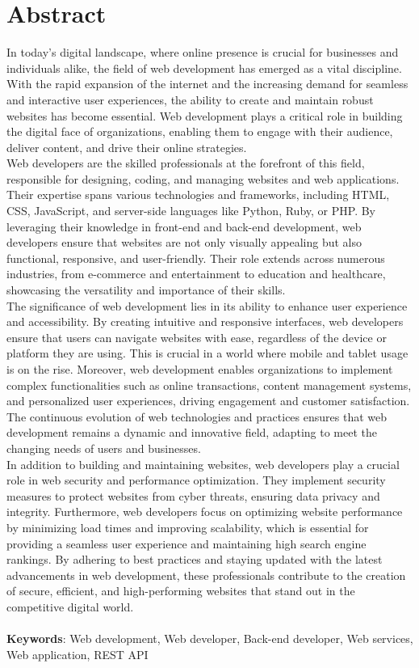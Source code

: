 \section{Abstract}

In today's digital landscape, where online presence is crucial for businesses and individuals alike, the field of web development has emerged as a vital discipline. With the rapid expansion of the internet and the increasing demand for seamless and interactive user experiences, the ability to create and maintain robust websites has become essential. Web development plays a critical role in building the digital face of organizations, enabling them to engage with their audience, deliver content, and drive their online strategies. \\
\newline
Web developers are the skilled professionals at the forefront of this field, responsible for designing, coding, and managing websites and web applications. Their expertise spans various technologies and frameworks, including HTML, CSS, JavaScript, and server-side languages like Python, Ruby, or PHP. By leveraging their knowledge in front-end and back-end development, web developers ensure that websites are not only visually appealing but also functional, responsive, and user-friendly. Their role extends across numerous industries, from e-commerce and entertainment to education and healthcare, showcasing the versatility and importance of their skills. \\
\newline
The significance of web development lies in its ability to enhance user experience and accessibility. By creating intuitive and responsive interfaces, web developers ensure that users can navigate websites with ease, regardless of the device or platform they are using. This is crucial in a world where mobile and tablet usage is on the rise. Moreover, web development enables organizations to implement complex functionalities such as online transactions, content management systems, and personalized user experiences, driving engagement and customer satisfaction. The continuous evolution of web technologies and practices ensures that web development remains a dynamic and innovative field, adapting to meet the changing needs of users and businesses. \\
\newline
In addition to building and maintaining websites, web developers play a crucial role in web security and performance optimization. They implement security measures to protect websites from cyber threats, ensuring data privacy and integrity. Furthermore, web developers focus on optimizing website performance by minimizing load times and improving scalability, which is essential for providing a seamless user experience and maintaining high search engine rankings. By adhering to best practices and staying updated with the latest advancements in web development, these professionals contribute to the creation of secure, efficient, and high-performing websites that stand out in the competitive digital world. \\ \\
\textbf{Keywords}: Web development, Web developer, Back-end developer, Web services, Web application, REST API